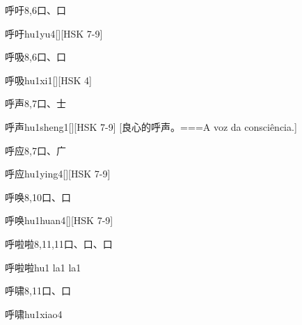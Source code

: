 \begin{Entry}{呼吁}{8,6}{⼝、⼝}
  \begin{Phonetics}{呼吁}{hu1yu4}[][HSK 7-9]
  \end{Phonetics}
\end{Entry}

\begin{Entry}{呼吸}{8,6}{⼝、⼝}
  \begin{Phonetics}{呼吸}{hu1xi1}[][HSK 4]
  \end{Phonetics}
\end{Entry}

\begin{Entry}{呼声}{8,7}{⼝、⼠}
  \begin{Phonetics}{呼声}{hu1sheng1}[][HSK 7-9]
    [良心的呼声。===A voz da consciência.]
  \end{Phonetics}
\end{Entry}

\begin{Entry}{呼应}{8,7}{⼝、⼴}
  \begin{Phonetics}{呼应}{hu1ying4}[][HSK 7-9]
  \end{Phonetics}
\end{Entry}

\begin{Entry}{呼唤}{8,10}{⼝、⼝}
  \begin{Phonetics}{呼唤}{hu1huan4}[][HSK 7-9]
  \end{Phonetics}
\end{Entry}

\begin{Entry}{呼啦啦}{8,11,11}{⼝、⼝、⼝}
  \begin{Phonetics}{呼啦啦}{hu1 la1 la1}
  \end{Phonetics}
\end{Entry}

\begin{Entry}{呼啸}{8,11}{⼝、⼝}
  \begin{Phonetics}{呼啸}{hu1xiao4}
  \end{Phonetics}
\end{Entry}

